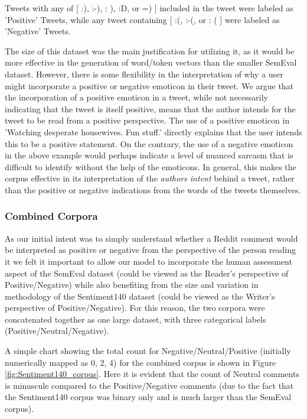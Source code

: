 \documentclass[11pt]{article}
\begin{document}
Tweets with any of [ :), :-), : ), :D, or =) ] included in the tweet were labeled as 'Positive' 
Tweets, while any tweet containing [ :(, :-(, or : ( ] were labeled as 'Negative' Tweets. 

The size of this dataset was the main justification for utilizing it, as it would 
be more effective in the generation of word/token vectors than the smaller SemEval 
dataset. However, there is some flexibility in the interpretation of why a user might 
incorporate a positive or negative emoticon in their tweet. We argue that the 
incorporation of a positive emoticon in a tweet, while not necessarily indicating that 
the tweet is itself positive, means that the author intends for the tweet to be read 
from a positive perspective. The use of a positive emoticon in 'Watching desperate 
housewives. Fun stuff.' directly explains that the user intends this to be a positive 
statement. On the contrary, the use of a negative emoticon in the above example would 
perhaps indicate a level of nuanced sarcasm that is difficult to identify without the 
help of the emoticons. In general, this makes the corpus effective in its 
interpretation of the {\em{authors intent}} behind a tweet, rather than the positive 
or negative indications from the words of the tweets themselves. 

\subsubsection{Combined Corpora}
As our initial intent was to simply understand whether a Reddit comment would be 
interpreted as positive or negative from the perspective of the person reading it we 
felt it important to allow our model to incorporate the human assessment aspect of the 
SemEval dataset (could be viewed as the Reader's perspective of Positive/Negative) 
while also benefiting from the size and variation in methodology of the Sentiment140 
dataset (could be viewed as the Writer's perspective of Positive/Negative). For this 
reason, the two corpora were concatenated together as one large dataset, with three 
categorical labels (Positive/Neutral/Negative). 

A simple chart showing the total count for Negative/Neutral/Positive (initially 
numerically mapped as 0, 2, 4) for the combined corpus is shown in Figure 
\ref{fig:Sentiment140_corpus}. Here it is evident that the count of Neutral comments 
is minuscule compared to the Positive/Negative comments (due to the fact that the 
Sentiment140 corpus was binary only and is much larger than the SemEval corpus). 
\end{document}
